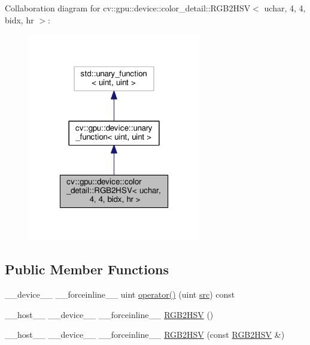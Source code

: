 Collaboration diagram for cv\-:\-:gpu\-:\-:device\-:\-:color\-\_\-detail\-:\-:R\-G\-B2\-H\-S\-V$<$ uchar, 4, 4, bidx, hr $>$\-:\nopagebreak
\begin{figure}[H]
\begin{center}
\leavevmode
\includegraphics[width=214pt]{structcv_1_1gpu_1_1device_1_1color__detail_1_1RGB2HSV_3_01uchar_00_014_00_014_00_01bidx_00_01hr_01_4__coll__graph}
\end{center}
\end{figure}
\subsection*{Public Member Functions}
\begin{DoxyCompactItemize}
\item 
\-\_\-\-\_\-device\-\_\-\-\_\- \-\_\-\-\_\-forceinline\-\_\-\-\_\- uint \hyperlink{structcv_1_1gpu_1_1device_1_1color__detail_1_1RGB2HSV_3_01uchar_00_014_00_014_00_01bidx_00_01hr_01_4_a5aa9d70a500338bb1d000a18ae914404}{operator()} (uint \hyperlink{legacy_8hpp_a371cd109b74033bc4366f584edd3dacc}{src}) const 
\item 
\-\_\-\-\_\-host\-\_\-\-\_\- \-\_\-\-\_\-device\-\_\-\-\_\- \-\_\-\-\_\-forceinline\-\_\-\-\_\- \hyperlink{structcv_1_1gpu_1_1device_1_1color__detail_1_1RGB2HSV_3_01uchar_00_014_00_014_00_01bidx_00_01hr_01_4_a9b6c252df8d4652cc3ccbebb06476753}{R\-G\-B2\-H\-S\-V} ()
\item 
\-\_\-\-\_\-host\-\_\-\-\_\- \-\_\-\-\_\-device\-\_\-\-\_\- \-\_\-\-\_\-forceinline\-\_\-\-\_\- \hyperlink{structcv_1_1gpu_1_1device_1_1color__detail_1_1RGB2HSV_3_01uchar_00_014_00_014_00_01bidx_00_01hr_01_4_a6926ead1823bffe21877383fe4fe8af0}{R\-G\-B2\-H\-S\-V} (const \hyperlink{structcv_1_1gpu_1_1device_1_1color__detail_1_1RGB2HSV}{R\-G\-B2\-H\-S\-V} \&)
\end{DoxyCompactItemize}


